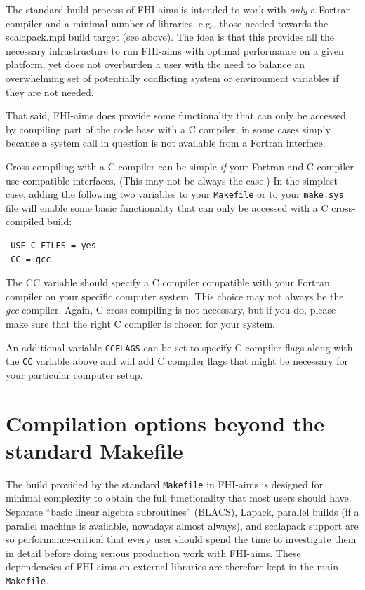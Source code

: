 The standard build process of FHI-aims is intended to work with
\emph{only} a Fortran compiler and a minimal number of libraries,
e.g., those needed towards the scalapack.mpi build target (see
above). The idea is that this provides all the necessary
infrastructure to run FHI-aims with optimal performance on a given
platform, yet does not overburden a user with the need to balance an
overwhelming set of potentially conflicting system or environment
variables if they are not needed.

That said, FHI-aims does provide some functionality that can only be
accessed by compiling part of the code base with a C compiler, in some
cases simply because a system call in question is not available from a
Fortran interface. 

Cross-compiling with a C compiler can be simple \emph{if} your Fortran
and C compiler use compatible interfaces. (This may not be always the
case.) In the simplest case, adding the following two variables to
your \texttt{Makefile} or to your \texttt{make.sys} file will enable
some basic functionality that can only be accessed with a C
cross-compiled build:

\begin{verbatim}
 USE_C_FILES = yes
 CC = gcc
\end{verbatim}

The CC variable should specify a C compiler compatible with your
Fortran compiler on your specific computer system. This choice may not
always be the \emph{gcc} compiler. Again, C cross-compiling is not
necessary, but if you do, please make sure that the right C compiler
is chosen for your system.

An additional variable \texttt{CCFLAGS} can be set to specify C
compiler flags along with the \texttt{CC} variable above and will add
C compiler flags that might be necessary for your particular computer setup.


\section{Compilation options beyond the standard Makefile}
\label{Sec:Makefiles}

The build provided by the standard \texttt{Makefile} in FHI-aims is designed
for minimal complexity to obtain the full functionality that most users should
have. Separate ``basic linear algebra subroutines'' (BLACS), Lapack,
parallel builds (if a parallel machine is available, nowadays almost always),
and scalapack support are so performance-critical that every user should spend
the time to investigate them in detail before doing serious production work
with FHI-aims. These dependencies of FHI-aims on external libraries are
therefore kept in the main \texttt{Makefile}.

